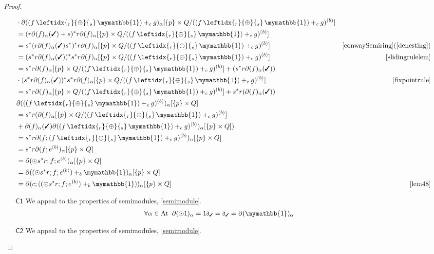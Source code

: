 \documentclass[a4paper,UKenglish,cleveref, autoref, thm-restate]{lipics-v2021}
\newcommand{\cmark}{\text{\ding{51}}}
\newcommand{\At}{\text{\upshape{At}}}
\newcommand{\WC}[2]{\,\leftidx{_{#1}}{{\oplus}}{_{#2}}\,}
\newcommand{\Ax}[1]{\ensuremath{\mathsf{#1}}}
\newcommand{\bskip}{\mymathbb{1}}
\theoremstyle{plain}\newtheoremrep{thm}{Theorem}[section]
\begin{document}
\begin{toappendix}
\begin{proof}
\begin{enumerate}
\begin{align*}
						&\cdot\partial((f \WC{r}{s} \bskip)+_c g)_\alpha[\{p\} \times Q/((f \WC{r}{s} \bskip)+_c g)^{(b)}]\\
					&= (r\partial(f)_\alpha(\cmark)+s)^*r\partial(f)_\alpha[\{p\} \times Q/((f \WC{r}{s} \bskip)+_c g)^{(b)}]\\
					&= s^*(r\partial(f)_\alpha(\cmark)s^*)^*r\partial(f)_\alpha[\{p\} \times Q/((f \WC{r}{s} \bskip)+_c g)^{(b)}] & \cref{conwaySemiring} (\ref{denesting})\\
					&= (s^*r\partial(f)_\alpha(\cmark))^*s^*r\partial(f)_\alpha[\{p\} \times Q/((f \WC{r}{s} \bskip)+_c g)^{(b)}] & \cref{slidingrulelem}\\
					&= s^*r\partial(f)_\alpha[\{p\} \times Q/((f \WC{r}{s} \bskip)+_c g)^{(b)}]+(s^*r\partial(f)_\alpha(\cmark))\\&\cdot(s^*r\partial(f)_\alpha(\cmark))^*s^*r\partial(f)_\alpha[\{p\} \times Q/((f \WC{r}{s} \bskip)+_c g)^{(b)}] & \cref{fixpointrule}\\
					&= s^*r\partial(f)_\alpha[\{p\} \times Q/((f \WC{r}{s} \bskip)+_c g)^{(b)}]+s^*r(\partial(f)_\alpha(\cmark))\\&\partial(((f \WC{r}{s} \bskip) +_c g)^{(b)})_\alpha[\{p\} \times Q]\\
					&= s^*r(\partial(f)_\alpha[\{p\} \times Q/((f \WC{r}{s} \bskip) +_c g)^{(b)}] \\&+ \partial(f)_\alpha(\cmark)\partial((f \WC{r}{s} \bskip) +_c g)^{(b)})_\alpha[\{p\} \times Q])\\
					&= s^*r\partial(f;(f \WC{r}{s} \bskip) +_c g)^{(b)})_\alpha[\{p\} \times Q]\\
					&= s^*r\partial(f;e^{(b)})_\alpha[\{p\} \times Q]\\
					&= \partial(\odot s^*r;f;e^{(b)})_\alpha[\{p\} \times Q]\\
					&=\partial((\odot s^*r;f;e^{(b)})+_b \bskip)_\alpha[\{p\} \times Q]\\
					&=\partial(c;((\odot s^*r;f;e^{(b)})+_b \bskip))_\alpha[\{p\} \times Q] & \cref{lem48}
				\end{align*}
				\item[\Ax{C1}]
				We appeal to the properties of semimodules, \cref{semimodule}.
				\begin{align*}
					\forall \alpha \in \At\;\;\partial(\odot 1)_\alpha = 1\delta_\cmark = \delta_\cmark = \partial(\bskip)_\alpha
				\end{align*}
				\item[\Ax{C2}]
				We appeal to the properties of semimodules, \cref{semimodule}.

\end{enumerate}
\end{proof}
\end{toappendix}
\end{document}
